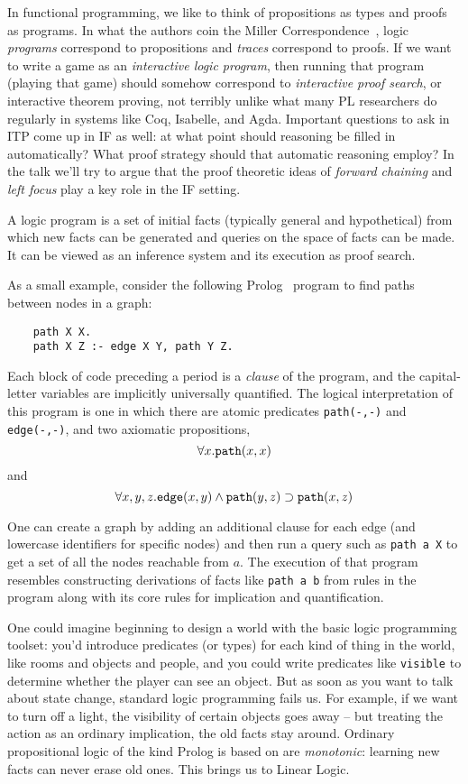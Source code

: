 \renewcommand{\implies}{\supset}

In functional programming, we like to think of propositions as
types and proofs as programs. In what the authors coin the Miller
Correspondence~\cite{millertalk}, logic {\em programs} correspond to propositions
and {\em traces} correspond to proofs. If we want to write a game as an
{\em interactive logic program}, then running that program (playing that
game) should somehow correspond to {\em interactive proof search}, or
interactive theorem proving, not terribly unlike what many PL researchers
do regularly in systems like Coq, Isabelle, and Agda. Important questions
to ask in ITP come up in IF as well: at what point should reasoning be
filled in automatically? What proof strategy should that automatic
reasoning employ? In the talk we'll try to argue that the proof theoretic
ideas of {\em forward chaining} and {\em left focus} play a key role in the
IF setting.

A logic program is a set of initial facts (typically general and
hypothetical) from which new facts can be generated and queries on the
space of facts can be made. It can be viewed as an inference system and its
execution as proof search.

As a small example, consider the following
Prolog~\cite{Covington:1996:PPD:230996} program to
find paths between nodes in a graph:

\begin{verbatim}
    path X X.
    path X Z :- edge X Y, path Y Z.
\end{verbatim}

Each block of code preceding a period is a {\em clause} of the program, and
the capital-letter variables are implicitly universally quantified.
The logical interpretation of this program is one in which there are atomic
predicates \verb|path(-,-)| and \verb|edge(-,-)|, and two axiomatic
propositions, 
\[\forall x.\verb|path|(x, x)\] 
and 
\[\forall x,y,z.\verb|edge|(x, y) \land \verb|path|(y, z) \implies 
\verb|path|(x, z)\]

One can create a graph by adding an additional clause for each edge (and
lowercase identifiers for specific nodes) and then run a query such as
\verb|path a X| to get a set of all the nodes reachable from $a$. The
execution of that program resembles constructing derivations of facts like
\verb|path a b| from rules in the program along with its core rules for
implication and quantification.

One could imagine beginning to design a world with the basic logic
programming toolset: you'd introduce predicates (or types) for each kind of
thing in the world, like rooms and objects and people, and you could write
predicates like \verb|visible| to determine whether the player can see an
object. But as soon as you want to talk about state change, standard logic
programming fails us. For example, if we want to turn off a light, the
visibility of certain objects goes away -- but treating the action as an
ordinary implication, the old facts stay around. Ordinary propositional
logic of the kind Prolog is based on are {\em monotonic}: learning new
facts can never erase old ones. This brings us to Linear Logic.

